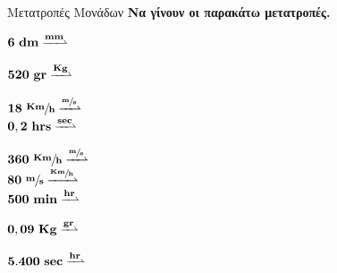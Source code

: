 \vspace{4mm}
\begin{ergasia}{Μετατροπές Μονάδων}
\textbf{Να γίνουν οι παρακάτω μετατροπές.}
\tcblower

$\mathbf{
6 \text{ }dm \xrightharpoonup{mm}}\\
$

$\mathbf{
520 \text{ } gr \xrightharpoonup{Kg}}\\
$

$
\mathbf{
18 }\text{ }\sfrac{\mathbf{Km}}{\mathbf{h}}
\xrightharpoonup{\sfrac{\mathbf{m}}{\mathbf{s}}}$\\

$\mathbf{
0,2 \text{ }hrs \xrightharpoonup{sec}}\\
$

$
\mathbf{
360 }\text{ }\sfrac{\mathbf{Km}}{\mathbf{h}}
\xrightharpoonup{\sfrac{\mathbf{m}}{\mathbf{s}}}$\\

$\mathbf{
80 }\text{ }\sfrac{\mathbf{m}}{\mathbf{s}}
\xrightharpoonup{\sfrac{\mathbf{Km}}{\mathbf{h}}}$\\

$\mathbf{
500 \text{ } min \xrightharpoonup{hr}}\\
$

$\mathbf{
0,09 \text{ }Kg \xrightharpoonup{gr}}\\
$

$\mathbf{
5.400 \text{ }sec \xrightharpoonup{hr}}\\
$

\end{ergasia}

%

